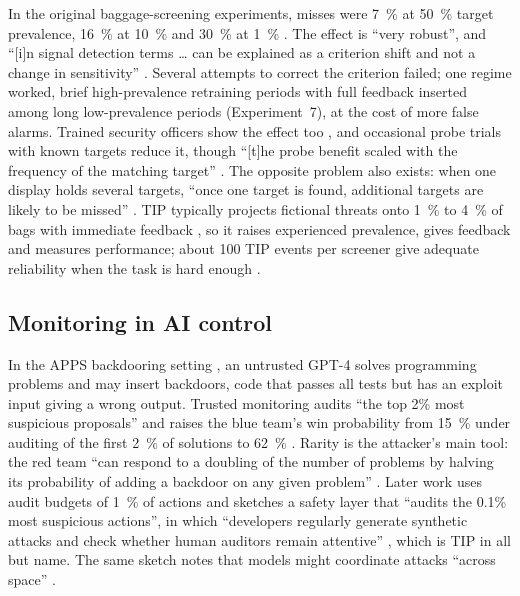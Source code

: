 \documentclass[manuscript, screen, review]{jair}
\begin{document}
In the original baggage-screening experiments, misses were \SI{7}{\percent} at \SI{50}{\percent} target prevalence, \SI{16}{\percent} at \SI{10}{\percent} and \SI{30}{\percent} at \SI{1}{\percent} \parencite{wolfe2005}. The effect is ``very robust'', and ``[i]n signal detection terms \ldots{} can be explained as a criterion shift and not a change in sensitivity'' \parencite[Abstract]{wolfe2007}. Several attempts to correct the criterion failed; one regime worked, brief high-prevalence retraining periods with full feedback inserted among long low-prevalence periods (Experiment~7), at the cost of more false alarms. Trained security officers show the effect too \parencite{wolfe2013}, and occasional probe trials with known targets reduce it, though ``[t]he probe benefit scaled with the frequency of the matching target'' \parencite[Abstract]{becker2026}. The opposite problem also exists: when one display holds several targets, ``once one target is found, additional targets are likely to be missed'' \parencite[Abstract]{cain2013}. TIP typically projects fictional threats onto \SI{1}{\percent} to \SI{4}{\percent} of bags with immediate feedback \parencite[Sec.~2]{buser2025}, so it raises experienced prevalence, gives feedback and measures performance; about 100 TIP events per screener give adequate reliability when the task is hard enough \parencite[Abstract]{buser2025}.

\subsection{Monitoring in AI control}\label{sec:control}

In the APPS backdooring setting \parencite{greenblatt2024}, an untrusted GPT-4 solves programming problems and may insert backdoors, code that passes all tests but has an exploit input giving a wrong output. Trusted monitoring audits ``the top 2\% most suspicious proposals'' and raises the blue team's win probability from \SI{15}{\percent} under auditing of the first \SI{2}{\percent} of solutions to \SI{62}{\percent} \parencite[Secs.~3.1.2 and 3.2]{greenblatt2024}. Rarity is the attacker's main tool: the red team ``can respond to a doubling of the number of problems by halving its probability of adding a backdoor on any given problem'' \parencite[Sec.~3.1.2]{greenblatt2024}. Later work uses audit budgets of \SI{1}{\percent} of actions \parencite[Sec.~2.2]{bhatt2025} and sketches a safety layer that ``audits the 0.1\% most suspicious actions'', in which ``developers regularly generate synthetic attacks and check whether human auditors remain attentive'' \parencite[Sec.~4]{korbak2025}, which is TIP in all but name. The same sketch notes that models might coordinate attacks ``across space'' \parencite[Sec.~6]{korbak2025}.
\end{document}
